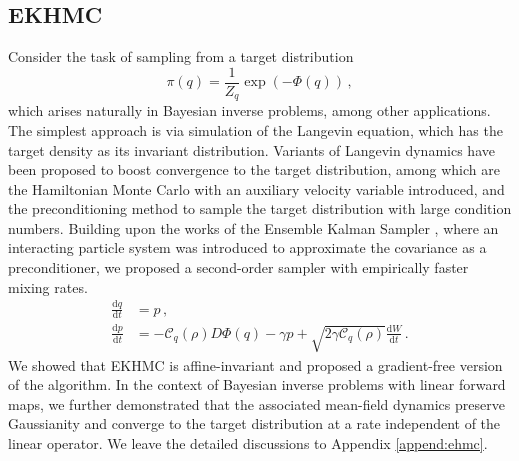 \documentclass[12pt]{caltech_thesis}
\numberwithin{equation}{section}
\begin{document}
\subsection{EKHMC}
\label{subsec:EHMC}
Consider the task of sampling from a target distribution $$\pi(q)=\frac{1}{Z_q}\exp(-\Phi(q))\,,$$
which arises naturally in Bayesian inverse problems, among other applications. The simplest approach is via simulation of the Langevin equation, which has the target density as its invariant distribution. Variants of Langevin dynamics have been proposed to boost convergence to the target distribution, among which are the Hamiltonian Monte Carlo with an auxiliary velocity variable introduced, and the preconditioning method to sample the target distribution with large condition numbers. Building upon the works of the Ensemble Kalman Sampler \cite{garbuno2020interacting}, where an interacting particle system was introduced to approximate the covariance as a preconditioner, we proposed a second-order sampler \cite{liu2022second} with empirically faster mixing rates.
\begin{equation*}
\begin{aligned}
\frac{\mathrm{d} q}{\mathrm{d} t}&= p\,, \\
\frac{\mathrm{d} p}{\mathrm{d} t}&=-\mathcal{C}_q(\rho)D \Phi(q)- {\gamma p+\sqrt{2\gamma \mathcal{C}_q(\rho)} \frac{\mathrm{d} W}{\mathrm{d} t}}\,.
\end{aligned}
\end{equation*}
We showed that EKHMC is affine-invariant and proposed a gradient-free version of the algorithm. In the context of Bayesian inverse problems with linear forward maps, we further demonstrated that the associated mean-field dynamics preserve Gaussianity and converge to the target distribution at a rate independent of the linear operator. We leave the detailed discussions to Appendix \ref{append:ehmc}.
\end{document}
